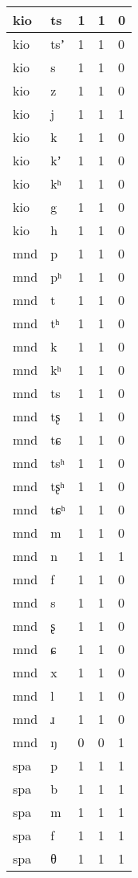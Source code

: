 \begin{longtable}{ | l | l | l | l | l | }
	kio & ts & 1 & 1 & 0 \\ \hline
	kio & tsʼ & 1 & 1 & 0 \\ \hline
	kio & s & 1 & 1 & 0 \\ \hline
	kio & z & 1 & 1 & 0 \\ \hline
	kio & j & 1 & 1 & 1 \\ \hline
	kio & k & 1 & 1 & 0 \\ \hline
	kio & kʼ & 1 & 1 & 0 \\ \hline
	kio & kʰ & 1 & 1 & 0 \\ \hline
	kio & g & 1 & 1 & 0 \\ \hline
	kio & h & 1 & 1 & 0 \\ \hline
	mnd & p & 1 & 1 & 0 \\ \hline
	mnd & pʰ & 1 & 1 & 0 \\ \hline
	mnd & t & 1 & 1 & 0 \\ \hline
	mnd & tʰ & 1 & 1 & 0 \\ \hline
	mnd & k & 1 & 1 & 0 \\ \hline
	mnd & kʰ & 1 & 1 & 0 \\ \hline
	mnd & ts & 1 & 1 & 0 \\ \hline
	mnd & tʂ & 1 & 1 & 0 \\ \hline
	mnd & tɕ & 1 & 1 & 0 \\ \hline
	mnd & tsʰ & 1 & 1 & 0 \\ \hline
	mnd & tʂʰ & 1 & 1 & 0 \\ \hline
	mnd & tɕʰ & 1 & 1 & 0 \\ \hline
	mnd & m & 1 & 1 & 0 \\ \hline
	mnd & n & 1 & 1 & 1 \\ \hline
	mnd & f & 1 & 1 & 0 \\ \hline
	mnd & s & 1 & 1 & 0 \\ \hline
	mnd & ʂ & 1 & 1 & 0 \\ \hline
	mnd & ɕ & 1 & 1 & 0 \\ \hline
	mnd & x & 1 & 1 & 0 \\ \hline
	mnd & l & 1 & 1 & 0 \\ \hline
	mnd & ɹ & 1 & 1 & 0 \\ \hline
	mnd & ŋ & 0 & 0 & 1 \\ \hline
	spa & p & 1 & 1 & 1 \\ \hline
	spa & b & 1 & 1 & 1 \\ \hline
	spa & m & 1 & 1 & 1 \\ \hline
	spa & f & 1 & 1 & 1 \\ \hline
	spa & θ & 1 & 1 & 1 \\ \hline

\end{longtable}

